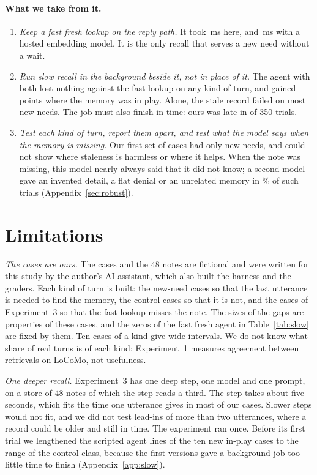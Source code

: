 \documentclass[10pt]{article}
\begin{document}
\paragraph{What we take from it.}

\begin{enumerate}[leftmargin=*,itemsep=2pt,topsep=3pt]
\item \emph{Keep a fast fresh lookup on the reply path.} It took \PreBlockMed\,ms here, and \HsRecallMs\,ms with a hosted embedding model. It is the only recall that serves a new need without a wait.
\item \emph{Run slow recall in the background beside it, not in place of it.} The agent with both lost nothing against the fast lookup on any kind of turn, and gained \SDiffBothFastC{} points where the memory was in play. Alone, the stale record failed on most new needs. The job must also finish in time: ours was late in \SNotReadyTrialsStale{} of 350 trials.
\item \emph{Test each kind of turn, report them apart, and test what the model says when the memory is missing.} Our first set of cases had only new needs, and could not show where staleness is harmless or where it helps. When the note was missing, this model nearly always said that it did not know; a second model gave an invented detail, a flat denial or an unrelated memory in \QwOtherLag\% of such trials (Appendix~\ref{sec:robust}).
\end{enumerate}

\section{Limitations}
\label{sec:limits}

\emph{The cases are ours.} The \SCases{} cases and the 48 notes are fictional and were written for this study by the author's AI assistant, which also built the harness and the graders. Each kind of turn is built: the new-need cases so that the last utterance is needed to find the memory, the control cases so that it is not, and the \SNewCases{} cases of Experiment~3 so that the fast lookup misses the note. The sizes of the gaps are properties of these cases, and the zeros of the fast fresh agent in Table~\ref{tab:slow} are fixed by them. Ten cases of a kind give wide intervals. We do not know what share of real turns is of each kind: Experiment~1 measures agreement between retrievals on LoCoMo, not usefulness.

\emph{One deeper recall.} Experiment~3 has one deep step, one model and one prompt, on a store of 48 notes of which the step reads a third. The step takes about five seconds, which fits the time one utterance gives in most of our cases. Slower steps would not fit, and we did not test lead-ins of more than two utterances, where a record could be older and still in time. The experiment ran once. Before its first trial we lengthened the scripted agent lines of the ten new in-play cases to the range of the control class, because the first versions gave a background job too little time to finish (Appendix~\ref{app:slow}).
\end{document}
